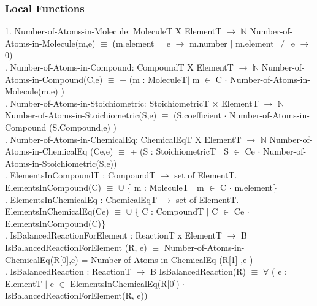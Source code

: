 \documentclass[12pt, titlepage]{article}
\begin{document}
\subsubsection{Local Functions}
1. Number-of-Atoms-in-Molecule: MoleculeT  X ElementT $\rightarrow$ $\mathbb{N}$
\newline
Number-of-Atoms-in-Molecule(m,e) $\equiv$ (m.element = e $\rightarrow$ m.number $\vert$ m.element $\neq$ e $\rightarrow$ 0) \\
. Number-of-Atoms-in-Compound: CompoundT  X ElementT $\rightarrow$ $\mathbb{N}$
\newline
Number-of-Atoms-in-Compound(C,e) $\equiv$ + (m : MoleculeT$\vert$ m $\in$ C $\cdot$   Number-of-Atoms-in-Molecule(m,e) ) \\
. Number-of-Atoms-in-Stoichiometric: StoichiometricT  $\times$ ElementT $\rightarrow$ $\mathbb{N}$
\newline
Number-of-Atoms-in-Stoichiometric(S,e) $\equiv$ (S.coefficient $\cdot$ Number-of-Atoms-in-Compound (S.Compound,e) )  \\
. Number-of-Atoms-in-ChemicalEq: ChemicalEqT  X ElementT $\rightarrow$ $\mathbb{N}$
\newline
Number-of-Atoms-in-ChemicalEq (Ce,e) $\equiv$ + (S : StoichiometricT $\vert$ S $\in$ Ce $\cdot$ Number-of-Atoms-in-Stoichiometric(S,e))\\
. ElementsInCompoundT : CompoundT $\rightarrow$ set of ElementT.
\newline
ElementsInCompound(C) $\equiv$ $\cup$ \{ m : MoleculeT $\vert$ m $\in$ C $\cdot$ m.element\}\\
. ElementsInChemicalEq : ChemicalEqT $\rightarrow$ set of ElementT.
\newline
ElementsInChemicalEq(Ce) $\equiv$ $\cup$ \{ C : CompoundT $\vert$ C $\in$ Ce $\cdot$ ElementsInCompound(C)\}\\
. IsBalancedReactionForElement : ReactionT x ElementT $\rightarrow$ B 
\newline
IsBalancedReactionForElement (R, e) $\equiv$ Number-of-Atoms-in-ChemicalEq(R[0],e) = Number-of-Atoms-in-ChemicalEq (R[1] ,e )\\ 
. IsBalancedReaction : ReactionT  $\rightarrow$ B 
\newline
IsBalancedReaction(R) $\equiv$ $\forall$ ( e :  ElementT $\vert$ e $\in$ ElementsInChemicalEq(R[0]) $\cdot$ IsBalancedReactionForElement(R, e))
\end{document}
